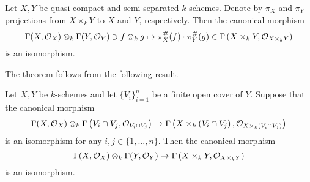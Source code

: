 \begin{theorem}\label{theorem:regular_functions_on_products}
Let $X,Y$ be quasi-compact and semi-separated $k$-schemes. Denote by $\pi_X$ and $\pi_Y$ projections from $X\times_kY$ to $X$ and $Y$, respectively. Then the canonical morphism
$$\Gamma(X,{\mathcal O}_X)\otimes_k\Gamma(Y,{\mathcal O}_Y)\ni f\otimes_k g\mapsto \pi_X^{\#}(f)\cdot \pi_Y^{\#}(g)\in \Gamma\left(X\times_kY,{\mathcal O}_{X\times_kY}\right)$$
is an isomorphism.
\end{theorem}
\noindent
The theorem follows from the following result.

\begin{lemma}\label{lemma:regular_functions_and_open_covers_of_a_factor}
Let $X,Y$ be $k$-schemes and let $\{V_i\}_{i=1}^n$ be a finite open cover of $Y$. Suppose that the canonical morphism
$$\Gamma(X,{\mathcal O}_X)\otimes_k\Gamma\left(V_i\cap V_j,{\mathcal O}_{V_i \cap V_j}\right) \rightarrow \Gamma\left( X \times_k \left(V_i\cap V_j\right),{\mathcal O}_{X\times_k\left(V_i \cap V_j\right)}\right)$$
is an isomorphism for any $i,j\in \{1,...,n\}$. Then the canonical morphism
$$\Gamma(X,{\mathcal O}_X)\otimes_k\Gamma(Y,{\mathcal O}_Y) \rightarrow \Gamma\left(X\times_kY,{\mathcal O}_{X\times_kY}\right)$$
is an isomorphism.
\end{lemma}
